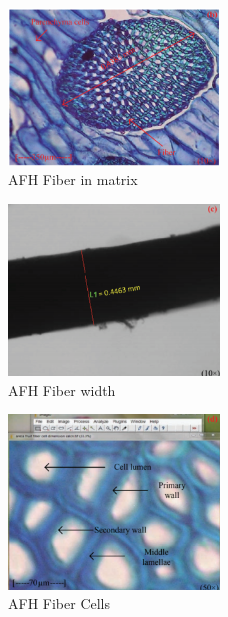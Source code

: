 \documentclass{article}
\begin{document}
\begin{figure}
  \centering
  \includegraphics[width=0.5\textwidth]{assets/afh_fiber_top.png}
  \caption{AFH Fiber in matrix \protect\autocite{afhfiber}}
  \label{fig:afhinmatrix}
\end{figure}

\begin{figure}
  \centering
  \includegraphics[width=0.5\textwidth]{assets/afh_fiber.png}
  \caption{AFH Fiber width \protect\autocite{afhfiber}}
  \label{fig:afhfiber}
\end{figure}

\begin{figure}
  \centering
  \includegraphics[width=0.5\textwidth]{assets/afh_cells.png}
  \caption{AFH Fiber Cells \protect\autocite{afhfiber}}
  \label{fig:afhcell}
\end{figure}
\end{document}
